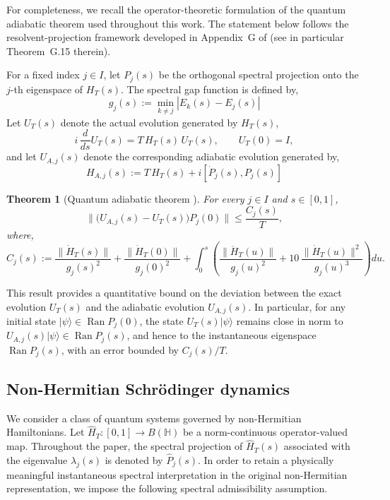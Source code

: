 \documentclass[pdflatex,sn-mathphys-num]{sn-jnl}
\theoremstyle{thmstyleone}
\newtheorem{theorem}{Theorem}
\theoremstyle{thmstyletwo}
\theoremstyle{thmstylethree}
\begin{document}
For completeness, we recall the operator-theoretic formulation of the quantum
adiabatic theorem used throughout this work. The statement below follows the
resolvent-projection framework developed in Appendix~G of \cite{Scherer2019}
(see in particular Theorem~G.15 therein).

For a fixed index $j\in I$, let $P_j(s)$ be the orthogonal spectral projection onto the \(j\)-th
eigenspace of $H_T(s)$. The spectral gap function is defined by,
\[
g_j(s):=\min_{k\neq j}|E_k(s)-E_j(s)|
\]
Let $U_T(s)$ denote the actual evolution generated by $H_T(s)$,
\[
i\,\frac{d}{ds}U_T(s)=T\,H_T(s)\,U_T(s), \qquad U_T(0)=I,
\]
and let $U_{A,j}(s)$ denote the corresponding adiabatic evolution generated by,
\[
H_{A,j}(s):=T\,H_T(s)+i[\dot P_j(s),P_j(s)]
\]

\begin{theorem}[Quantum adiabatic theorem {\cite[Theorem~G.15]{Scherer2019}}]
\label{Thm:StandardAdiabatic}
For every $j\in I$ and $s\in[0,1]$,
\[
\big\|\big(U_{A,j}(s)-U_T(s)\big)P_j(0)\big\|
\le
\frac{C_j(s)}{T},
\]
where,
\[
C_j(s)
:=
\frac{\|\dot H_T(s)\|}{g_j(s)^2}
+
\frac{\|\dot H_T(0)\|}{g_j(0)^2}
+
\int_0^s
\left(
\frac{\|\ddot H_T(u)\|}{g_j(u)^2}
+
10\,\frac{\|\dot H_T(u)\|^2}{g_j(u)^3}
\right)du .
\]
\end{theorem}

This result provides a quantitative bound on the deviation between the exact
evolution $U_T(s)$ and the adiabatic evolution $U_{A,j}(s)$. In particular, for
any initial state $|\psi\rangle \in \operatorname{Ran} P_j(0)$, the state $U_T(s)|\psi\rangle$
remains close in norm to $U_{A,j}(s)|\psi\rangle \in \operatorname{Ran} P_j(s)$,
and hence to the instantaneous eigenspace $\operatorname{Ran} P_j(s)$, with an error bounded by \(C_j(s)/T\).

\subsection{Non-Hermitian Schr\"odinger dynamics}

We consider a class of quantum systems governed by non-Hermitian Hamiltonians.
Let $\hat H_T:[0,1]\to B(\mathbb{H})$ be a norm-continuous operator-valued map. Throughout the paper, the spectral projection of \(\hat H_T(s)\) associated with the eigenvalue \(\lambda_j(s)\) is denoted by \(\hat P_j(s)\). In order to retain a physically meaningful instantaneous spectral interpretation in the
original non-Hermitian representation, we impose the following spectral admissibility
assumption.
\end{document}
